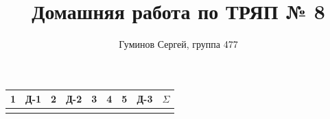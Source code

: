 \documentclass{article}
\renewcommand {\*} {\ast}
\begin{document}
\author{Гуминов Сергей, группа 477}

\title{Домашняя работа по ТРЯП № 8}
\maketitle
\begin{center}


\begin{tabular}{|c|c|c|c|c|c|c|c|c|}
\hline
1&Д-1&2&Д-2&3&4&5&Д-3&$\Sigma$\\
\hline
&&&&&&&&\\
\hline
\end{tabular}
 
\end{center}
\end{document}
